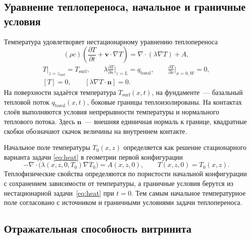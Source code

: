 \subsection{Уравнение теплопереноса, начальное и граничные условия}

Температура удовлетворяет нестационарному уравнению теплопереноса
\begin{equation}
 (\rho c)\left(\frac{\partial T}{\partial t} + \boldsymbol v \cdot \nabla T\right)
   = \nabla \cdot (\lambda\nabla T) + A,
 \label{eq:heat}
\end{equation}
\begin{gather}
 T\big|_{z = z_{\mathrm{surf}}} = T_{\mathrm{surf}},\qquad
 \lambda\frac{\partial T}{\partial n}\bigg|_{z = L} = q_{\mathrm{basal}},\qquad
 \frac{\partial T}{\partial x}\bigg|_{x = 0,W} = 0,\\
 [T] = 0,\qquad [\lambda\nabla T \cdot \boldsymbol n] = 0.
\end{gather}
На поверхности задаётся температура $T_{\mathrm{surf}}(x,t)$, на фундаменте~--- базальный тепловой поток $q_{\mathrm{basal}}(x,t)$, боковые границы теплоизолированы. На контактах слоёв выполняются условия непрерывности температуры и нормального теплового потока. Здесь $\boldsymbol n$~--- внешняя единичная нормаль к границе, квадратные скобки обозначают скачок величины на внутреннем контакте.

Начальное поле температуры $T_0(x,z)$ определяется как решение стационарного варианта задачи \eqref{eq:heat} в геометрии первой конфигурации
\begin{equation}
 -\nabla \cdot \bigl(\lambda(x,z,0,T_0)\nabla T_0\bigr) = A(x,z,0),
 \qquad T(x,z,0) = T_0(x,z).
\end{equation}
Теплофизические свойства определяются по пористости начальной конфигурации с сохранением зависимости от температуры, а граничные условия берутся из нестационарной задачи~\eqref{eq:heat} при $t=0$. Тем самым начальное температурное поле согласовано с источником и граничными условиями задачи теплопереноса.


\subsection{Отражательная способность витринита}

